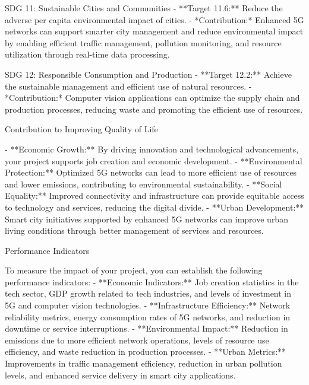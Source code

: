 SDG 11: Sustainable Cities and Communities
- **Target 11.6:** Reduce the adverse per capita environmental impact of cities.
- *Contribution:* Enhanced 5G networks can support smarter city management and reduce environmental impact by enabling efficient traffic management, pollution monitoring, and resource utilization through real-time data processing.

SDG 12: Responsible Consumption and Production
- **Target 12.2:** Achieve the sustainable management and efficient use of natural resources.
- *Contribution:* Computer vision applications can optimize the supply chain and production processes, reducing waste and promoting the efficient use of resources.

Contribution to Improving Quality of Life

- **Economic Growth:** By driving innovation and technological advancements, your project supports job creation and economic development.
- **Environmental Protection:** Optimized 5G networks can lead to more efficient use of resources and lower emissions, contributing to environmental sustainability.
- **Social Equality:** Improved connectivity and infrastructure can provide equitable access to technology and services, reducing the digital divide.
- **Urban Development:** Smart city initiatives supported by enhanced 5G networks can improve urban living conditions through better management of services and resources.

Performance Indicators

To measure the impact of your project, you can establish the following performance indicators:
- **Economic Indicators:** Job creation statistics in the tech sector, GDP growth related to tech industries, and levels of investment in 5G and computer vision technologies.
- **Infrastructure Efficiency:** Network reliability metrics, energy consumption rates of 5G networks, and reduction in downtime or service interruptions.
- **Environmental Impact:** Reduction in emissions due to more efficient network operations, levels of resource use efficiency, and waste reduction in production processes.
- **Urban Metrics:** Improvements in traffic management efficiency, reduction in urban pollution levels, and enhanced service delivery in smart city applications.